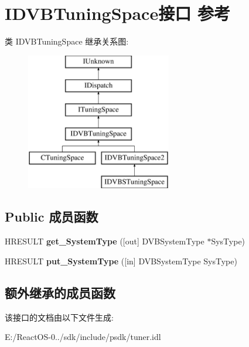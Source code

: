\hypertarget{interface_i_d_v_b_tuning_space}{}\section{I\+D\+V\+B\+Tuning\+Space接口 参考}
\label{interface_i_d_v_b_tuning_space}
类 I\+D\+V\+B\+Tuning\+Space 继承关系图\+:\begin{figure}[H]
\begin{center}
\leavevmode
\includegraphics[height=6.000000cm]{interface_i_d_v_b_tuning_space}
\end{center}
\end{figure}
\subsection*{Public 成员函数}
\begin{DoxyCompactItemize}
\item 
\mbox{\label{interface_i_d_v_b_tuning_space_a6dd6b62e7462066aae3b24e9b68a8cb1}} 
H\+R\+E\+S\+U\+LT {\bfseries get\+\_\+\+System\+Type} (\mbox{[}out\mbox{]} D\+V\+B\+System\+Type $\ast$Sys\+Type)
\item 
\mbox{\label{interface_i_d_v_b_tuning_space_a02dbfe37f5d973996672366ca66d3f53}} 
H\+R\+E\+S\+U\+LT {\bfseries put\+\_\+\+System\+Type} (\mbox{[}in\mbox{]} D\+V\+B\+System\+Type Sys\+Type)
\end{DoxyCompactItemize}
\subsection*{额外继承的成员函数}


该接口的文档由以下文件生成\+:\begin{DoxyCompactItemize}
\item 
E\+:/\+React\+O\+S-\/0../sdk/include/psdk/tuner.\+idl\end{DoxyCompactItemize}
